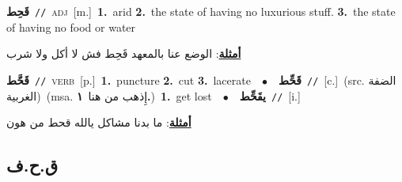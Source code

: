\documentclass[10pt,a4paper,twoside]{article} %
\begin{document}
\begin{multicols}{2}
{\setlength\topsep{0pt}\textbf{\foreignlanguage{arabic}{قَحِط}}\ {\color{gray}\texttt{//}\color{black}}\ \textsc{adj}\ [m.]\ \textbf{1.}~arid  \textbf{2.}~the state of having no luxurious stuff.  \textbf{3.}~the state of having no food or water\  \begin{flushright}\color{gray}\foreignlanguage{arabic}{\textbf{\underline{\foreignlanguage{arabic}{أمثلة}}}: الوضع عنا بالمعهد قَحِط فش لا أكل ولا شرب}\end{flushright}\color{black}} \vspace{2mm}

{\setlength\topsep{0pt}\textbf{\foreignlanguage{arabic}{قَحَّط}}\ {\color{gray}\texttt{//}\color{black}}\ \textsc{verb}\ [p.]\ \textbf{1.}~puncture  \textbf{2.}~cut  \textbf{3.}~lacerate\ \ $\bullet$\ \ \setlength\topsep{0pt}\textbf{\foreignlanguage{arabic}{قَحِّط}}\ {\color{gray}\texttt{//}\color{black}}\ [c.]\ (src. \color{gray}\foreignlanguage{arabic}{الضفة الغربية}\color{black})\ \color{gray}(msa. \foreignlanguage{arabic}{إِذهب من هنا}~\foreignlanguage{arabic}{\textbf{١.}})\color{black}\ \textbf{1.}~get lost\ \ $\bullet$\ \ \setlength\topsep{0pt}\textbf{\foreignlanguage{arabic}{يقَحِّط}}\ {\color{gray}\texttt{//}\color{black}}\ [i.]\  \begin{flushright}\color{gray}\foreignlanguage{arabic}{\textbf{\underline{\foreignlanguage{arabic}{أمثلة}}}: ما بدنا مشاكل يالله قحط من هون}\end{flushright}\color{black}} \vspace{2mm}

\vspace{-3mm}
\subsection*{\color{blue}\foreignlanguage{arabic}{ق.ح.ف}\color{blue}{}} 


\end{multicols}
\end{document}
